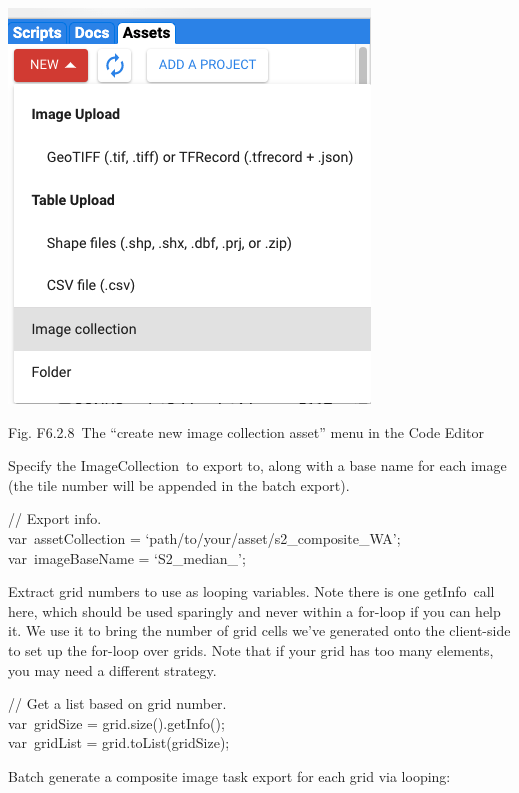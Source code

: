 \documentclass[
  letterpaper,
  DIV=11,
  numbers=noendperiod]{scrreprt}
\begin{document}
\includegraphics{./F6/image15.png}

Fig. F6.2.8~The ``create new image collection asset'' menu in the Code
Editor

Specify the ImageCollection~to export to, along with a base name for
each image (the tile number will be appended in the batch export).

// Export info.\\
var~assetCollection = `path/to/your/asset/s2\_composite\_WA';\\
var~imageBaseName = `S2\_median\_';

Extract grid numbers to use as looping variables. Note there is one
getInfo~call here, which should be used sparingly and never within a
for-loop if you can help it. We use it to bring the number of grid cells
we've generated onto the client-side to set up the for-loop over grids.
Note that if your grid has too many elements, you may need a different
strategy.

// Get a list based on grid number.\\
var~gridSize = grid.size().getInfo();\\
var~gridList = grid.toList(gridSize);

Batch generate a composite image task export for each grid via looping:
\end{document}
